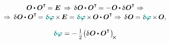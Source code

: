 \begin{otherlanguage}{russian}
\nopagebreak\vspace{-0.5em}\begin{multline*}
\scalebox{0.98}{$ \rotationtensor \hspace{-0.1ex} \dotp \rotationtensor^{\T} \hspace{-0.2ex} = \UnitDyad
\:\Rightarrow\,
\variation{\hspace{.1ex}\rotationtensor} \hspace{-0.1ex} \dotp \rotationtensor^{\T} \hspace{-0.2ex}
= - \hspace{.2ex} \rotationtensor \hspace{-0.1ex} \dotp \variation{\hspace{.1ex}\rotationtensor}^{\T}
\Rightarrow $}
\\[-0.15em]
%
\scalebox{0.98}{$ \Rightarrow\,
\variation{\hspace{.1ex}\rotationtensor} \hspace{-0.1ex} \dotp \rotationtensor^{\T} \hspace{-0.25ex}
= \hspace{.1ex} \littlerotationvector \hspace{-0.2ex} \times \hspace{-0.2ex} \UnitDyad
= \hspace{.1ex} \littlerotationvector \hspace{-0.2ex} \times \hspace{-0.2ex} \rotationtensor \hspace{-0.1ex} \dotp \rotationtensor^{\T}
\Rightarrow\,
\variation{\hspace{.1ex}\rotationtensor} \hspace{-0.1ex} = \littlerotationvector \hspace{-0.2ex} \times \hspace{-0.2ex} \rotationtensor , $}
\end{multline*}

\vspace{-0.4em}\begin{equation*}
\littlerotationvector = - \, \smalldisplaystyleonehalf \hspace{.1ex}
\scalebox{1}{$ \left( \variation{\hspace{.1ex}\rotationtensor} \hspace{-0.1ex} \dotp^{\mathstrut} \hspace{-0.1ex} \rotationtensor^{\T} \hspace{.1ex} \right)_{\hspace{-0.15em}\Xcompanion} $}
\end{equation*}


\end{otherlanguage}
